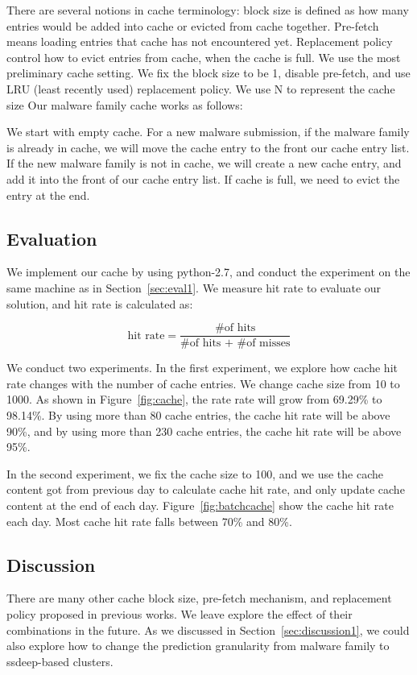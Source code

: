 There are several notions in cache terminology: 
block size is defined as how many entries would be added into cache or evicted from cache together.
Pre-fetch means loading entries that cache has not encountered yet. 
Replacement policy control how to evict entries from cache, when the cache is full. 
We use the most preliminary cache setting. We fix the block size to be 1, disable pre-fetch, 
and use LRU (least recently used) replacement policy. We use N to represent the cache size
Our malware family cache works as follows:  

We start with empty cache. 
For a new malware submission, if the malware family is already in cache, we will move the cache entry to the front our cache entry list. 
If the new malware family is not in cache, 
we will create a new cache entry, and add it into the front of our cache entry list. 
If cache is full, we need to evict the entry at the end. 


\subsection{Evaluation}

We implement our cache by using python-2.7, 
and conduct the experiment on the same machine as in Section~\ref{sec:eval1}. 
We measure hit rate to evaluate our solution, and hit rate is calculated as: 

$$ \mbox{hit rate} = \dfrac{\mbox{\# of hits}}{\mbox{\# of hits + \# of misses}}$$

We conduct two experiments. In the first experiment, 
we explore how cache hit rate changes with the number of cache entries. 
We change cache size from 10 to 1000. As shown in Figure~\ref{fig:cache}, 
the rate rate will grow from 69.29\% to 98.14\%. 
By using more than 80 cache entries, the cache hit rate will be above 90\%, 
and by using more than 230 cache entries, the cache hit rate will be above 95\%. 

In the second experiment, we fix the cache size to 100, 
and we use the cache content got from previous day to calculate cache hit rate, 
and only update cache content at the end of each day. Figure~\ref{fig:batchcache} show the cache hit rate each day. 
Most cache hit rate falls between 70\% and 80\%.  

\subsection{Discussion}
There are many other cache block size, pre-fetch mechanism, and replacement policy proposed in previous works. 
We leave explore the effect of their combinations in the future. 
As we discussed in Section~\ref{sec:discussion1}, 
we could also explore how to change the prediction granularity from malware family to ssdeep-based clusters. 